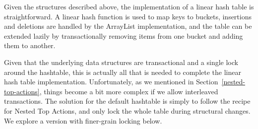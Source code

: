 \documentclass[10pt,letterpaper,twocolumn,english]{article}
\newcommand{\yad}{Lemon\xspace}
\begin{document}
Given the structures described above, the implementation of a linear
hash table is straightforward.  A linear hash function is used to map
keys to buckets, insertions and deletions are handled by the ArrayList
implementation, and the table can be extended lazily by
transactionally removing items from one bucket and adding them to
another.

Given that the underlying data structures are transactional and a
single lock around the hashtable, this is actually all that is needed
to complete the linear hash table implementation.  Unfortunately, as
we mentioned in Section~\ref{nested-top-actions}, things become a bit
more complex if we allow interleaved transactions.  The solution for
the default hashtable is simply to follow the recipe for Nested
Top Actions, and only lock the whole table during structural changes.
We explore a version with finer-grain locking below.

%
\end{document}
